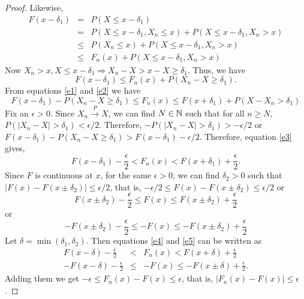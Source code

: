 \documentclass{article}
\begin{document}
\begin{proof}
Likewise,
\begin{eqnarray*}
F(x - \delta_1) &=& P(X \le x - \delta_1) \\
 &=& P(X \le x - \delta_1, X_n \le x) + P(X \le x - \delta_1, X_n > x) \\
 &\le& P(X_n \le x) + P(X \le x - \delta_1, X_n > x) \\
 &\le& F_n(x) + P(X \le x - \delta_1, X_n > x)
\end{eqnarray*}
Now $X_n > x, X \le x - \delta_1 \Rightarrow X_n - X > x - X \ge \delta_1$. Thus,
we have
\begin{equation}\label{e2}
F(x - \delta_1) \le F_n(x) + P(X_n - X \ge \delta_1).
\end{equation}
From equations \eqref{e1} and \eqref{e2} we have
\begin{equation}\label{e3}
F(x - \delta_1) - P(X_n - X \ge \delta_1) \le F_n(x) \le F(x + \delta_1) + 
P(X - X_n > \delta_1)
\end{equation}
Fix an $\epsilon > 0$. Since $X_n \stackrel{P}\rightarrow X$, we can find $N
\in \mathbb{N}$ such that for all $n \ge N$, $P(|X_n - X| > \delta_1) < \epsilon/2$.
Therefore, $-P(|X_n - X| > \delta_1) > -\epsilon/2$ or $F(x - \delta_1) - 
P(X_n - X \ge \delta_1) > F(x - \delta_1) - \epsilon/2$. Therefore, equation \eqref{e3}
gives,
\begin{equation}\label{e4}
F(x - \delta_1) - \frac{\epsilon}{2} < F_n(x) < 
F(x + \delta_1) + \frac{\epsilon}{2}.
\end{equation}
Since $F$ is continuous at $x$, for the same $\epsilon > 0$, we can find 
$\delta_2 > 0$ such that $|F(x) - F(x \pm \delta_2)| \le \epsilon/2$, that is,
$-\epsilon/2 \le F(x) - F(x \pm \delta_2) \le \epsilon/2$ or
\[
F(x \pm \delta_2) -\frac{\epsilon}{2} \le F(x) \le F(x \pm \delta_2) + 
\frac{\epsilon}{2}
\]
or
\begin{equation}\label{e5}
-F(x \pm \delta_2) - \frac{\epsilon}{2} \le -F(x) \le -F(x \pm \delta_2) + 
\frac{\epsilon}{2}
\end{equation}
Let $\delta = \min(\delta_1, \delta_2)$. Then equations \eqref{e4} and \eqref{e5}
can be written as 
\begin{eqnarray*}
F(x - \delta) - \frac{\epsilon}{2} &<& F_n(x) < F(x + \delta) + \frac{\epsilon}{2} \\
-F(x - \delta) - \frac{\epsilon}{2} &\le& -F(x) \le -F(x \pm \delta) + \frac{\epsilon}{2}.
\end{eqnarray*}
Adding them we get $-\epsilon \le F_n(x) - F(x) \le \epsilon$, that is, $|F_n(x)
- F(x)| \le \epsilon$.
\end{proof}
\end{document}
